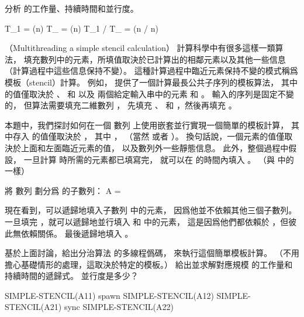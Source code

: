\stopANSWER

\startigBase[continue]\startitem
分析  的工作量、持續時間和並行度。
\stopitem\stopigBase

\startANSWER
\startformula\startmathalignment
\NC T_1 \NC = \Theta(n) \NR
\NC T_{\infty} \NC = \Theta(\lg n) \NR
\NC T_1 / T_{\infty} \NC = \Theta(n / \lg n) \NR
\stopmathalignment\stopformula
\stopANSWER

\stopPROBLEM

\startPROBLEM
（Multithreading a simple stencil calculation）
計算科學中有很多這樣一類算法，
填充數列中的元素，所填值取決於已計算出的相鄰元素以及其他一些信息
（計算過程中這些信息保持不變）。
這種計算過程中臨近元素保持不變的模式稱爲{\EMP 模板（stencil）}計算。
例如， 提供了一個計算最長公共子序列的模板算法，
其中  的值僅取決於 、  和  以及
兩個給定輸入串中的元素  和 。
輸入的序列是固定不變的，
但算法需要填充二維數列 ，
先填充 、  和 ，然後再填充 。

本題中，我們探討如何在一個  數列  上使用嵌套並行實現一個簡單的模板計算，
其中存入  的值僅取決於 ，
其中 ，  （當然  或者 ）。
換句話說，一個元素的值僅取決於上面和左面臨近元素的值，
以及數列外一些靜態信息。
此外，整個過程中假設，
一旦計算  時所需的元素都已填寫完，
就可以在  的時間內填入 。
（與 中的  一樣）

將  數列  劃分爲  的子數列：
\startformula
A = 
\stopformula

現在看到，可以遞歸地填入子數列  中的元素，
因爲他並不依賴其他三個子數列。
一旦填完 ，就可以遞歸地並行填入  和  中的元素，
這是因爲他們都依賴於 ，但彼此無依賴關係。
最後遞歸地填入 。

\startigBase[a]\startitem
基於上面討論，給出分治算法  的多線程僞碼，
來執行這個簡單模板計算。
（不用擔心基礎情形的處理，這取決於特定的模板。）
給出並求解對應規模  的工作量和持續時間的遞歸式。
並行度是多少？
\stopitem\stopigBase

\startANSWER
{}
\startCLRS
SIMPLE-STENCIL(A11)
spawn SIMPLE-STENCIL(A12)
SIMPLE-STENCIL(A21)
sync
SIMPLE-STENCIL(A22)
\stopCLRS

